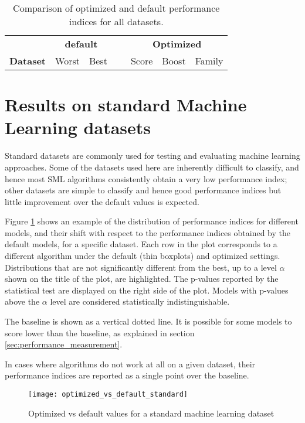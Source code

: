 \begin{table}[h!]
\centering
\begin{tabularx}{\textwidth}{l r r r r r l}
	& \multicolumn{2}{c}{\bf default} & ~ & \multicolumn{3}{c}{\bf Optimized}\\
	\cline{2-3}
	\cline{5-7}
{\bf Dataset} & Worst & Best & ~ & Score & Boost & Family\\
	\cline{1-7}
	
\end{tabularx}
\caption{Comparison of optimized and default performance indices for all datasets.}
\label{tb:comparison_all}
\end{table}

\section{Results on standard Machine Learning datasets}

Standard datasets are commonly used for testing and evaluating machine learning approaches. Some of
the datasets used here are inherently difficult to classify, and hence most SML algorithms
consistently obtain a very low performance index; other datasets are simple to classify and hence
good performance indices but little improvement over the default values is expected.

Figure \ref{img:optvsdefstandard} shows an example of the distribution of performance indices for
different models, and their shift with respect to the performance indices obtained by the default
models, for a specific dataset. Each row in the plot corresponds to a different algorithm under the
default (thin boxplots) and optimized settings. Distributions that are not significantly different
from the best, up to a level $\alpha$ shown on the title of the plot, are highlighted. The p-values
reported by the statistical test are displayed on the right side of the plot. Models with p-values
above the $\alpha$ level are considered statistically indistinguishable.

The baseline is shown as a vertical dotted line. It is possible for some models to score lower than the
baseline, as explained in section \ref{sec:performance_measurement}.

In cases where algorithms do not work at all on a given dataset, their performance indices are
reported as a single point over the baseline.

\begin{figure}[h!]
	\centering
	\texttt{[image: optimized\_vs\_default\_standard]}
	\caption{Optimized vs default values for a standard machine learning dataset}
	\label{img:optvsdefstandard}
\end{figure}


